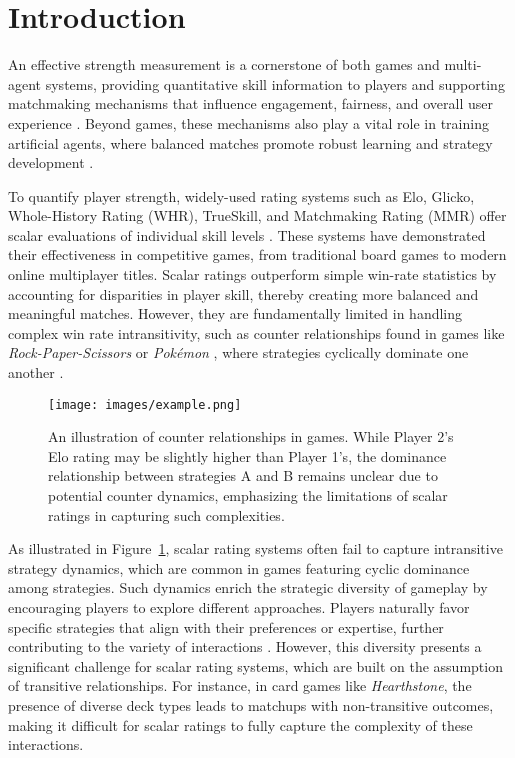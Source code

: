 
\section{Introduction}

An effective strength measurement is a cornerstone of both games and multi-agent systems, providing quantitative skill information to players and supporting matchmaking mechanisms that influence engagement, fairness, and overall user experience \citep{art_of_game_design}. Beyond games, these mechanisms also play a vital role in training artificial agents, where balanced matches promote robust learning and strategy development \citep{alpha_star}.

To quantify player strength, widely-used rating systems such as Elo, Glicko, Whole-History Rating (WHR), TrueSkill, and Matchmaking Rating (MMR) offer scalar evaluations of individual skill levels \citep{elo, glicko,whr,true_skill,mmr,elo_mmr}. These systems have demonstrated their effectiveness in competitive games, from traditional board games to modern online multiplayer titles. Scalar ratings outperform simple win-rate statistics by accounting for disparities in player skill, thereby creating more balanced and meaningful matches. However, they are fundamentally limited in handling complex win rate intransitivity, such as counter relationships found in games like \textit{Rock-Paper-Scissors} or \textit{Pok\'emon}
, where strategies cyclically dominate one another \citep{game_balance_analysis, nash_entropy_balancing}.

\begin{figure}[t]
    \centering
    \texttt{[image: images/example.png]}
    \caption{An illustration of counter relationships in games. While Player 2's Elo rating may be slightly higher than Player 1's, the dominance relationship between strategies A and B remains unclear due to potential counter dynamics, emphasizing the limitations of scalar ratings in capturing such complexities.}
    \label{fig:counter_relationships}
\end{figure}

As illustrated in Figure~\ref{fig:counter_relationships}, scalar rating systems often fail to capture intransitive strategy dynamics, which are common in games featuring cyclic dominance among strategies. Such dynamics enrich the strategic diversity of gameplay by encouraging players to explore different approaches. Players naturally favor specific strategies that align with their preferences or expertise, further contributing to the variety of interactions \citep{playstyle_distance,playstyle_similarity}. However, this diversity presents a significant challenge for scalar rating systems, which are built on the assumption of transitive relationships. For instance, in card games like \textit{Hearthstone}, the presence of diverse deck types leads to matchups with non-transitive outcomes, making it difficult for scalar ratings to fully capture the complexity of these interactions.

